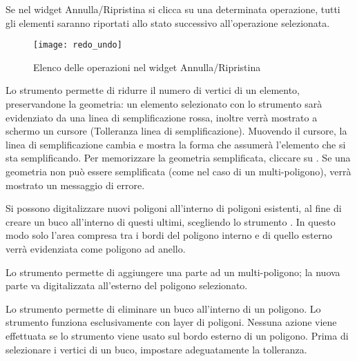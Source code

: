 Se nel widget Annulla/Ripristina si clicca su una determinata operazione, tutti gli
elementi saranno riportati allo stato successivo all'operazione selezionata.

\begin{figure}[ht]
   \centering
   \texttt{[image: redo\_undo]}
   \caption{Elenco delle operazioni nel widget Annulla/Ripristina \wincaption}\label{fig:vector_redoundo}
\end{figure}


Lo strumento  permette di ridurre il numero di 
vertici di un elemento, preservandone la geometria: un elemento selezionato con lo strumento 
sarà evidenziato da una linea di semplificazione rossa, inoltre verrà mostrato a schermo un cursore 
(Tolleranza linea di semplificazione). Muovendo il cursore, la linea di semplificazione cambia e 
mostra la forma che assumerà l'elemento che si sta semplificando. Per memorizzare la geometria 
semplificata, cliccare su .
Se una geometria non può essere semplificata (come nel caso di un multi-poligono), verrà mostrato un 
messaggio di errore.


Si possono digitalizzare nuovi poligoni all'interno di poligoni esistenti, al fine
di creare un buco all'interno di questi ultimi, scegliendo lo strumento .
In questo modo solo l'area compresa tra i bordi del poligono interno e di
quello esterno verrà  evidenziata come poligono ad anello. 


Lo strumento  permette di aggiungere 
una parte ad un multi-poligono; la nuova parte va digitalizzata all'esterno del poligono 
selezionato.


Lo strumento  permette di eliminare un 
buco all'interno di un poligono. Lo strumento funziona esclusivamente con layer di poligoni. 
Nessuna azione viene effettuata se lo strumento viene usato sul bordo esterno di un poligono.
Prima di selezionare i vertici di un buco, impostare adeguatamente la tolleranza.

